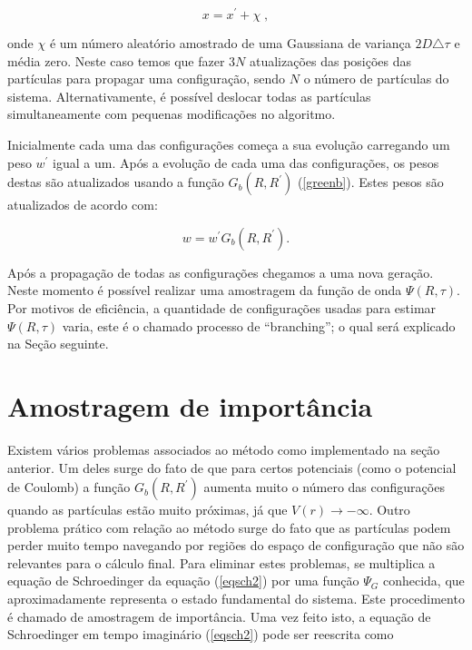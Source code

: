 \documentclass[12pt,twoside,a4paper]{report}
\begin{document}
\begin{equation}
x = x^{'} + \chi \; ,
\end{equation}

\noindent onde $\chi$ é um número aleatório amostrado de uma
Gaussiana de variança
$2D\triangle\tau$ e média zero. Neste caso temos que fazer $3N$ atualizações das
posições das partículas
para propagar uma
configuração, sendo $N$ o número de partículas do sistema. Alternativamente, é
possível deslocar todas as partículas simultaneamente com pequenas modificações no
algoritmo.

Inicialmente cada uma das configurações começa a sua evolução
carregando um peso
$w^{'}$ igual a um. Após a evolução de cada uma das configurações, os pesos destas
são atualizados usando a função $G_b(R,R^{'})$ (\ref{greenb}). Estes pesos são
atualizados de acordo com:

\begin{equation} \label{atpesos}
w=w^{'}G_b(R,R^{'}).
\end{equation}

Após a propagação de todas as configurações chegamos a uma nova
geração. Neste momento é possível realizar uma
amostragem da função de onda $\Psi(R,\tau)$. Por motivos de
eficiência, a quantidade
de configurações usadas para estimar $\Psi(R,\tau)$ varia, este
é o chamado processo
de ``branching''; o qual será explicado na Seção seguinte.

\section{Amostragem de importância}

Existem vários problemas associados ao método como implementado na seção anterior.
Um deles surge do
fato de que para certos potenciais (como o potencial de Coulomb) a
função
$G_b(R,R^{'})$ aumenta muito o número das configurações quando
as partículas estão
muito próximas, já que $V(r) \rightarrow -\infty$.
Outro problema prático com relação ao
método surge do fato que as partículas podem perder muito tempo navegando 
por
regiões do espaço
de configuração que não são relevantes para o cálculo final. Para
eliminar estes problemas, se multiplica a equação de Schroedinger da equação 
(\ref{eqsch2}) por uma
função $\Psi_G$ conhecida, que aproximadamente representa o
estado
fundamental do sistema. Este procedimento é chamado de
amostragem de importância. Uma vez feito isto, a equação de Schroedinger em 
tempo
imaginário
(\ref{eqsch2}) pode ser reescrita como
\end{document}
